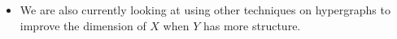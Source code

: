 \documentclass[final]{beamer}
\newlength{\onecolwid}
\begin{document}
\begin{frame}[t]
\begin{columns}[t]
\begin{column}{\onecolwid}
\begin{block}{}
\begin{itemize}
	\item We are also currently looking at using other techniques on hypergraphs to improve the dimension of $X$ when $Y$ has more structure.
\end{itemize}

\end{block}











\end{column} %

\end{columns} %

\end{frame} %
\end{document}
